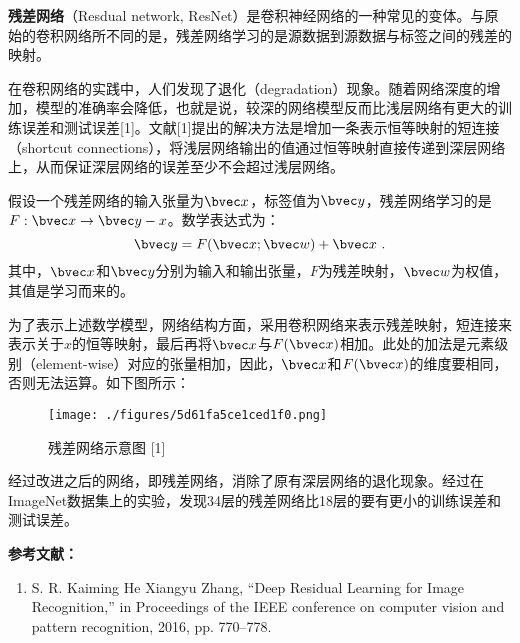 


\textbf{残差网络}（Resdual network, ResNet）是卷积神经网络的一种常见的变体。与原始的卷积网络所不同的是，残差网络学习的是源数据到源数据与标签之间的残差的映射。

在卷积网络的实践中，人们发现了退化（degradation）现象。随着网络深度的增加，模型的准确率会降低，也就是说，较深的网络模型反而比浅层网络有更大的训练误差和测试误差[1]。文献[1]提出的解决方法是增加一条表示恒等映射的短连接（shortcut connections），将浅层网络输出的值通过恒等映射直接传递到深层网络上，从而保证深层网络的误差至少不会超过浅层网络。

假设一个残差网络的输入张量为$\bvec x$，标签值为$\bvec y$，残差网络学习的是$F: \bvec x \rightarrow \bvec y-x$。数学表达式为：
\begin{equation}
\bvec y=F(\bvec  x;\bvec  w)+\bvec x~.
\end{equation}
其中，$\bvec x$和$\bvec y$分别为输入和输出张量，$F$为残差映射，$\bvec w$为权值，其值是学习而来的。

为了表示上述数学模型，网络结构方面，采用卷积网络来表示残差映射，短连接来表示关于$x$的恒等映射，最后再将$\bvec x$与$F(\bvec x)$相加。此处的加法是元素级别（element-wise）对应的张量相加，因此，$\bvec x$和$F(\bvec x)$的维度要相同，否则无法运算。如下图所示：
\begin{figure}[ht]
\centering
\texttt{[image: ./figures/5d61fa5ce1ced1f0.png]}
\caption{残差网络示意图 [1]} \label{fig_ResNet}
\end{figure}

经过改进之后的网络，即残差网络，消除了原有深层网络的退化现象。经过在ImageNet数据集上的实验，发现34层的残差网络比18层的要有更小的训练误差和测试误差。


\textbf{参考文献：}
\begin{enumerate}
\item S. R. Kaiming He Xiangyu Zhang, “Deep Residual Learning for Image Recognition,” in Proceedings of the IEEE conference on computer vision and pattern recognition, 2016, pp. 770–778.
\end{enumerate}